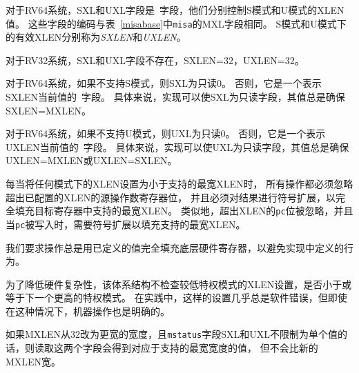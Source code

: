 \fi

对于RV64系统，SXL和UXL字段是\warl\ 字段，他们分别控制S模式和U模式的XLEN值。
这些字段的编码与表~\ref{misabase}中{\tt misa}的MXL字段相同。
S模式和U模式下的有效XLEN分别称为{\em SXLEN}和{\em UXLEN}。

对于RV32系统，SXL和UXL字段不存在，SXLEN=32，UXLEN=32。

对于RV64系统，如果不支持S模式，则SXL为只读0。
否则，它是一个表示SXLEN当前值的\warl\ 字段。
具体来说，实现可以使SXL为只读字段，其值总是确保SXLEN=MXLEN。

对于RV64系统，如果不支持U模式，则UXL为只读0。
否则，它是一个表示UXLEN当前值的\warl\ 字段。
具体来说，实现可以使UXL为只读字段，其值总是确保UXLEN=MXLEN或UXLEN=SXLEN。

每当将任何模式下的XLEN设置为小于支持的最宽XLEN时，
所有操作都必须忽略超出已配置的XLEN的源操作数寄存器位，
并且必须对结果进行符号扩展，以完全填充目标寄存器中支持的最宽XLEN。
类似地，超出XLEN的{\tt pc}位被忽略，并且当{\tt pc}被写入时，需要符号扩展以填充支持的最宽XLEN。


\iffalse
\begin{commentary}
We require that operations always fill the entire underlying hardware
registers with defined values to avoid implementation-defined
behavior.

To reduce hardware complexity, the architecture imposes no checks that
lower-privilege modes have XLEN settings less than or equal to the
next-higher privilege mode.  In practice, such settings would almost
always be a software bug, but machine operation is well-defined even in this
case.
\end{commentary}
\fi


\begin{commentary}
我们要求操作总是用已定义的值完全填充底层硬件寄存器，以避免实现中定义的行为。

为了降低硬件复杂性，该体系结构不检查较低特权模式的XLEN设置，是否小于或等于下一个更高的特权模式。
在实践中，这样的设置几乎总是软件错误，但即使在这种情况下，机器操作也是明确的。
\end{commentary}

\iffalse
If MXLEN is changed from 32 to a wider width, each of {\tt mstatus} fields SXL and
UXL, if not restricted to a single value, gets the value corresponding to the
widest supported width not wider than the new MXLEN.
\fi

如果MXLEN从32改为更宽的宽度，且{\tt mstatus}字段SXL和UXL不限制为单个值的话，则读取这两个字段会得到对应于支持的最宽宽度的值，
但不会比新的MXLEN宽。

